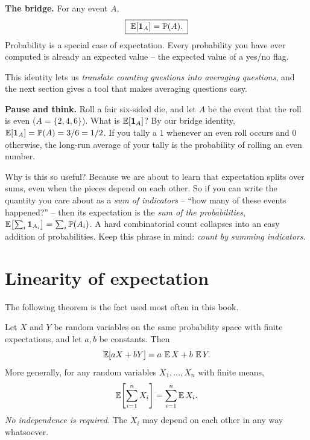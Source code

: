 \begin{formalbox}
\textbf{The bridge.} For any event $A$,
\[
  \boxed{\;\operatorname{\mathbb{E}}[\mathbf{1}_A] = \operatorname{\mathbb{P}}(A).\;}
\]
Probability is a special case of expectation. Every probability you have ever
computed is already an expected value -- the expected value of a yes/no flag.
\end{formalbox}

This identity lets us \emph{translate counting questions into averaging
questions}, and the next section gives a tool that makes averaging questions
easy.

\begin{recoverybox}
\textbf{Pause and think.} Roll a fair six-sided die, and let $A$ be the event
that the roll is even ($A = \{2, 4, 6\}$). What is $\operatorname{\mathbb{E}}[\mathbf{1}_A]$? By our bridge
identity, $\operatorname{\mathbb{E}}[\mathbf{1}_A] = \operatorname{\mathbb{P}}(A) = 3/6 = 1/2$. If you tally a $1$ whenever an even
roll occurs and $0$ otherwise, the long-run average of your tally is
the probability of rolling an even number.
\end{recoverybox}

\begin{happeningbox}
Why is this so useful? Because we are about to learn that expectation splits over
sums, even when the pieces depend on each other. So if you can write
the quantity you care about as a \emph{sum of indicators} -- ``how many of these
events happened?'' -- then its expectation is the \emph{sum of the
probabilities}, $\operatorname{\mathbb{E}}\bigl[\sum_i \mathbf{1}_{A_i}\bigr] = \sum_i \operatorname{\mathbb{P}}(A_i)$. A hard
combinatorial count collapses into an easy addition of probabilities. Keep this
phrase in mind: \emph{count by summing indicators}.
\end{happeningbox}

\section{Linearity of expectation}
\label{ch08:linearity}

The following theorem is the fact used most often in this book.

\begin{theorem}
\label{ch08:thm-linearity}
Let $X$ and $Y$ be random variables on the same probability space with finite
expectations, and let $a, b$ be constants. Then
\[
  \operatorname{\mathbb{E}}[aX + bY] = a\,\operatorname{\mathbb{E}} X + b\,\operatorname{\mathbb{E}} Y.
\]
More generally, for any random variables $X_1,\dots,X_n$ with finite means,
\[
  \operatorname{\mathbb{E}}\!\left[\sum_{i=1}^n X_i\right] = \sum_{i=1}^n \operatorname{\mathbb{E}} X_i.
\]
\emph{No independence is required.} The $X_i$ may depend on each other in any way
whatsoever.
\end{theorem}

